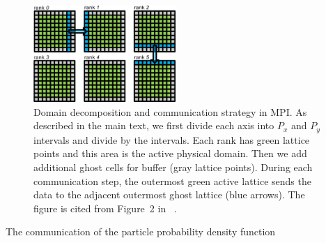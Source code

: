 \begin{figure}
  \centering
  \includegraphics[width=0.48\textwidth]{imgs/mpi-conceptual.pdf}
  \caption{
    Domain decomposition and communication strategy in MPI.
    As described in the main text, we first divide each axis
    into $P_x$ and $P_y$ intervals and divide by the intervals.
    Each rank has green lattice points and this area is the active physical domain.
    Then we add additional ghost cells for buffer (gray lattice points).
    During each communication step, the outermost green active lattice
    sends the data to the adjacent outermost ghost lattice (blue arrows).
    The figure is cited from Figure~2 in ~\cite{pastewka2019hpc}.
  }
  \label{mpi-conceptual}
\end{figure}

\begin{algorithm}[b]
  \caption{The communication of
  the particle probability density function}
  \label{alg:mpi-algorithm}
  \begin{algorithmic}[1]
    \Indent
     
     
    \EndIf
    \EndIndent
    \EndFunction
  \end{algorithmic}
\end{algorithm}

